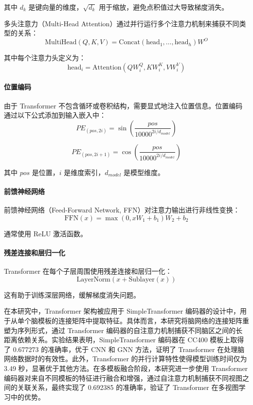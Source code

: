 \documentclass[12pt,a4paper]{article}
\begin{document}
其中 $d_k$ 是键向量的维度，$\sqrt{d_k}$ 用于缩放，避免点积值过大导致梯度消失。

多头注意力（Multi-Head Attention）通过并行运行多个注意力机制来捕获不同类型的关系：
\begin{equation}
\text{MultiHead}(Q, K, V) = \text{Concat}(\text{head}_1, \ldots, \text{head}_h)W^O
\end{equation}

其中每个注意力头定义为：
\begin{equation}
\text{head}_i = \text{Attention}(QW_i^Q, KW_i^K, VW_i^V)
\end{equation}

\paragraph{位置编码}
由于 Transformer 不包含循环或卷积结构，需要显式地注入位置信息。位置编码通过以下公式添加到输入嵌入中：
\begin{equation}
PE_{(pos, 2i)} = \sin\left(\frac{pos}{10000^{2i/d_{model}}}\right)
\end{equation}

\begin{equation}
PE_{(pos, 2i+1)} = \cos\left(\frac{pos}{10000^{2i/d_{model}}}\right)
\end{equation}

其中 $pos$ 是位置，$i$ 是维度索引，$d_{model}$ 是模型维度。

\paragraph{前馈神经网络}
前馈神经网络（Feed-Forward Network, FFN）对注意力输出进行非线性变换：
\begin{equation}
\text{FFN}(x) = \max(0, xW_1 + b_1)W_2 + b_2
\end{equation}

通常使用 ReLU 激活函数。

\paragraph{残差连接和层归一化}
Transformer 在每个子层周围使用残差连接和层归一化：
\begin{equation}
\text{LayerNorm}(x + \text{Sublayer}(x))
\end{equation}

这有助于训练深层网络，缓解梯度消失问题。

在本研究中，Transformer 架构被应用于 SimpleTransformer 编码器的设计中，用于从单个脑模板的连接矩阵中提取特征。具体而言，本研究将脑网络的连接矩阵重塑为序列形式，通过 Transformer 编码器的自注意力机制捕获不同脑区之间的长距离依赖关系。实验结果表明，SimpleTransformer 编码器在 CC400 模板上取得了 0.677273 的准确率，优于 CNN 和 GNN 方法，证明了 Transformer 在处理脑网络数据时的有效性。此外，Transformer 的并行计算特性使得模型训练时间仅为 3.49 秒，显著优于其他方法。在多模板融合阶段，本研究进一步使用 Transformer 编码器对来自不同模板的特征进行融合和增强，通过自注意力机制捕获不同视图之间的关联关系，最终实现了 0.692385 的准确率，验证了 Transformer 在多视图学习中的优势。
\end{document}
